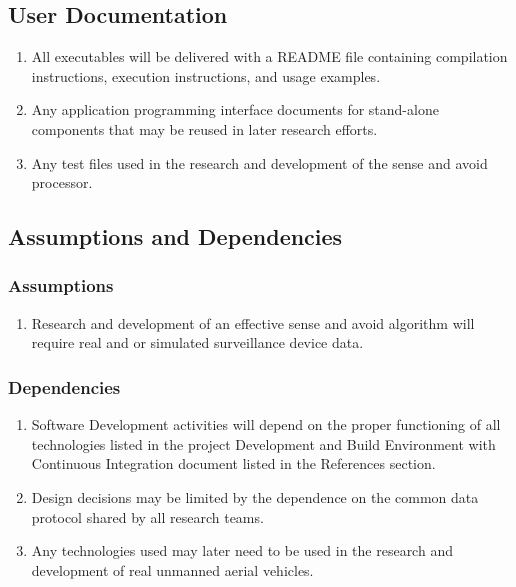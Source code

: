 \documentclass[12pt,oneside,letterpaper]{article}
\begin{document}
\subsection{User Documentation}
\begin{enumerate}
\item All executables will be delivered with a README file containing compilation instructions, execution instructions, and usage examples.
\item Any application programming interface documents for stand-alone components that may be reused in later research efforts.
\item Any test files used in the research and development of the sense and avoid processor.
\end{enumerate}

\subsection{Assumptions and Dependencies}
\subsubsection{Assumptions}
\begin{enumerate}
\item Research and development of an effective sense and avoid algorithm will require real and or simulated surveillance device data.
\end{enumerate}

\subsubsection{Dependencies}
\begin{enumerate}
\item Software Development activities will depend on the proper functioning of all technologies listed in the project Development and Build Environment with Continuous Integration document listed in the References section.
\item Design decisions may be limited by the dependence on the common data protocol shared by all research teams.
\item Any technologies used may later need to be used in the research and development of real unmanned aerial vehicles.
\end{enumerate}
\end{document}
